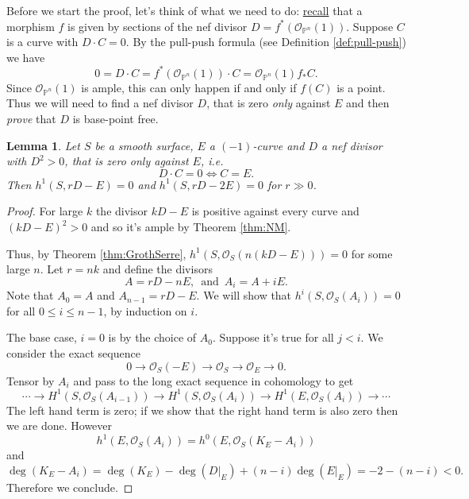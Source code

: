 \documentclass[a4paper,11pt]{amsart}
\newtheorem{lemma}[theorem]{Lemma}
\def\deg{\operatorname{deg}}
\def\NE{\operatorname{NE}}
\newcommand{\OO}{\mathcal{O}}
\newcommand{\RR}{\mathbb{R}}
\newcommand{\PP}{\mathbb{P}}
\newcommand{\defeq}{\vcentcolon=}
\begin{document}
Before we start the proof, let's think of what we need to do:
\hyperlink{rem:maps}{recall} that a morphism $f$ is given by sections of the nef divisor $D = f^*(\OO_{\PP^n}(1))$.
Suppose $C$ is a curve with $D\cdot C = 0$.
By the pull-push formula (see Definition \ref{def:pull-push}) we have
\[
0 = D \cdot C = f^*(\OO_{\PP^n}(1)) \cdot C = \OO_{\PP^n}(1) f_*C.
\]
Since $\OO_{\PP^n}(1)$ is ample, this can only happen if and only if $f(C)$ is a point.
Thus we will need to find a nef divisor $D$, that is zero \emph{only} against $E$ and then \emph{prove} that $D$ is base-point free.


\begin{lemma}\label{lem:vanishing}
	Let $S$ be a smooth surface, $E$ a $(-1)$-curve and $D$ a nef divisor with $D^2>0$, that is zero only against $E$, i.e.\
	\[
	D\cdot C = 0 \iff C = E.
	\]
	Then $h^1(S,rD-E) = 0$ and $h^1(S,rD-2E) = 0$ for  $r\gg 0$.
\end{lemma}

\begin{proof}
	For large $k$ the divisor $kD-E$ is positive against every curve and $(kD-E)^2>0$ and so it's ample by Theorem \ref{thm:NM}.
	\begin{comment}
		\footnote{\underline{{The \emph{``standard''} compactness argument}}: Fix a norm $\left\lVert \cdot \right\rVert$ on $N_1(S)$ so that $\left\lVert E \right\rVert = 1$ and consider the functionals
			\[
			\begin{array}{ccccccc}
				d\colon N_1(S) &\to  & \RR, & &e\colon N_1(S) &\to  & \RR\\
				C & \mapsto & D\cdot C & & C & \mapsto & E\cdot C.
			\end{array}
			\]
			Let $U$ be a neighbourhood of $E$ so that $e(x)<0$, for all $x \in U$, and define $V \defeq (S^1\setminus U) \cap \NE(S)$.
			Since $n$ is continuous and $V$ is a closed subset of a compact set (thus compact), $n$ admits a minimum at $V$.
		}
	\end{comment}
	Thus, by Theorem \ref{thm:GrothSerre}, $h^1(S,\OO_S(n(kD-E)))=0$ for some large $n$.
	Let $r = nk$ and define the divisors
	\[
	A = rD - nE, \, \text{ and } \, A_i = A + iE.
	\]
	Note that $A_0 = A$ and $A_{n-1} = rD - E$.
	We will show that $h^i(S,\OO_S(A_i)) = 0$ for all $0\leq i \leq n-1$, by induction on $i$.
	
	The base case, $i=0$ is by the choice of $A_0$.
	Suppose it's true for all $j < i$.
	We consider the exact sequence
	\[
	0 \to \OO_S(-E) \to \OO_S \to \OO_E \to 0.
	\]
	Tensor by $A_i$ and pass to the long exact sequence in cohomology to get
	\[
	\cdots \to H^1(S,\OO_S(A_{i-1})) \to H^1(S,\OO_S(A_i)) \to H^1(E,\OO_S(A_i)) \to \cdots
	\]
	The left hand term is zero; if we show that the right hand term is also zero then we are done.
	However 
	\[
	h^1(E,\OO_S(A_i)) = h^0(E,\OO_S(K_E - A_i))
	\]
	and
	\[
	\deg(K_E - A_i) = \deg(K_E) - \deg(D|_E) + (n-i)\deg(E|_E) = -2 - (n-i) < 0.
	\]
	Therefore we conclude.
\end{proof}
\end{document}
